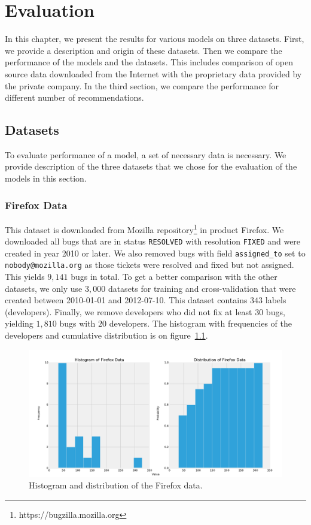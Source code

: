 \chapter{Evaluation}
\label{chapter:evaluation}

In this chapter, we present the results for various models on three datasets. First, we provide a description and origin of these datasets. Then we compare the performance of the models and the datasets. This includes comparison of open source data downloaded from the Internet with the proprietary data provided by the private company. In the third section, we compare the performance for different number of recommendations.

\section{Datasets}
\label{section:datasets}

To evaluate performance of a model, a set of necessary data is necessary. We provide description of the three datasets that we chose for the evaluation of the models in this section.

\subsection{Firefox Data}

This dataset is downloaded from Mozilla repository\footnote{https://bugzilla.mozilla.org} in product Firefox. We downloaded all bugs that are in status \texttt{RESOLVED} with resolution \texttt{FIXED} and were created in year 2010 or later. We also removed bugs with field \texttt{assigned\_to} set to \texttt{nobody@mozilla.org} as those tickets were resolved and fixed but not assigned. This yields $9,141$ bugs in total. To get a better comparison with the other datasets, we only use $3,000$ datasets for training and cross-validation that were created between 2010-01-01 and 2012-07-10. This dataset contains $343$ labels (developers). Finally, we remove developers who did not fix at least $30$ bugs, yielding $1,810$ bugs with $20$ developers. The histogram with frequencies of the developers and cumulative distribution is on figure~\ref{fig:datasets.firefox.dist}.

\begin{figure}[htbp]
    \centering
        \includegraphics[width=\textwidth]{./images/distribution/firefox.pdf}
    \caption{Histogram and distribution of the Firefox data.}
    \label{fig:datasets.firefox.dist}
\end{figure}

